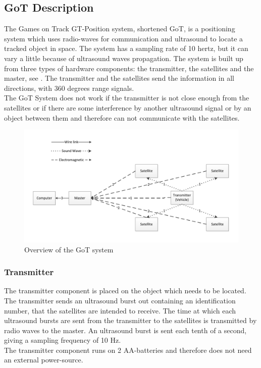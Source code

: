 \subsection{GoT Description}
\label{GoTDescription}
The Games on Track GT-Position system, shortened GoT, is a positioning system which uses radio-waves for communication and ultrasound to locate a tracked object in space. The system has a sampling rate of 10 hertz, but it can vary a little because of ultrasound waves propagation. The system is built up from three types of hardware components: the transmitter, the satellites and the master, see . The transmitter and the satellites send the information in all directions, with 360 degrees range signals.\\
The GoT System does not work if the transmitter is not close enough from the satellites or if there are some interference by another ultrasound signal or by an object between them and therefore can not communicate with the satellites.
%
\begin{figure}[H]
	\centering
	\includegraphics[scale=0.7]{figures/GoT_description.pdf}
	\caption{Overview of the GoT system}
	\label{GoTSystem}
\end{figure}
%
\subsubsection{Transmitter}
The transmitter component is placed on the object which needs to be located. The transmitter sends an ultrasound burst out containing an identification number, that the satellites are intended to receive. The time at which each ultrasound bursts are sent from the transmitter to the satellites is transmitted by radio waves to the master. An ultrasound burst is sent each tenth of a second, giving a sampling frequency of 10 Hz.\\ 
The transmitter component runs on 2 AA-batteries and therefore does not need an external power-source.
%
